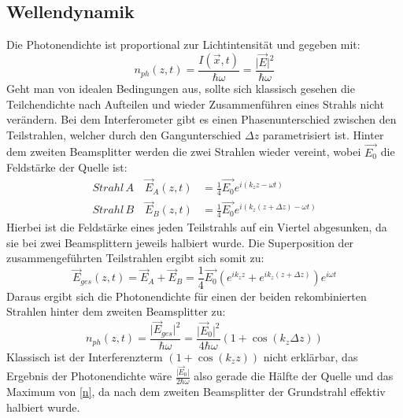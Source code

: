 \documentclass{include/thesisclass3}
\begin{document}
\subsection{Wellendynamik}
Die Photonendichte ist proportional zur Lichtintensität und gegeben mit:
\begin{equation}
n_{ph}(z,t)=\frac{I(\vec{x},t)}{\hbar \omega}=\frac{\vert \vec{E}\vert ^2}{\hbar \omega}
\end{equation}
Geht man von idealen Bedingungen aus, sollte sich klassisch gesehen die Teilchendichte nach Aufteilen und wieder Zusammenführen eines Strahls nicht verändern. Bei dem Interferometer gibt es einen Phasenunterschied zwischen den Teilstrahlen, welcher durch den Gangunterschied $\Delta z$ parametrisiert ist. Hinter dem zweiten Beamsplitter werden die zwei Strahlen wieder vereint, wobei $\vec{E_0}$ die Feldstärke der Quelle ist:
\begin{align}
\si{Strahl\, A}\quad \vec{E}_A(z,t)&=\frac{1}{4}\vec{E_0}e^{i(k_z z-\omega t)}\\
\si{Strahl\, B}\quad \vec{E}_B(z,t)&=\frac{1}{4}\vec{E_0}e^{i(k_z (z+\Delta z)-\omega t)}
\end{align}
Hierbei ist die Feldstärke eines jeden Teilstrahls auf ein Viertel abgesunken, da sie bei zwei Beamsplittern jeweils halbiert wurde. Die Superposition der zusammengeführten Teilstrahlen ergibt sich somit zu:
\begin{equation}
\vec{E}_{ges}(z,t)= \vec{E}_A+\vec{E}_B=\frac{1}{4}\vec{E_0}(e^{ik_z z}+e^{ik_z (z+\Delta z)})e^{i\omega t}
\end{equation}
Daraus ergibt sich die Photonendichte für einen der beiden rekombinierten Strahlen hinter dem zweiten Beamsplitter zu:
\begin{equation}
n_{ph}(z,t)=\frac{\vert \vec{E}_{ges} \vert ^2}{\hbar \omega}=\frac{\vert \vec{E}_0\vert ^2}{4\hbar\omega}(1+\cos(k_z\Delta z))\label{n}
\end{equation}
Klassisch ist der Interferenzterm $(1+\cos(k_z z))$ nicht erklärbar, das Ergebnis der Photonendichte wäre $\frac{\vert \vec{E}_0\vert}{2\hbar \omega}$ also gerade die Hälfte der Quelle und das Maximum von \ref{n}, da nach dem zweiten Beamsplitter der Grundstrahl effektiv halbiert wurde. 
\end{document}
